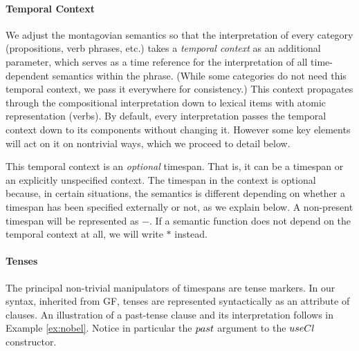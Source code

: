 \documentclass[a4paper,11pt]{article}
\begin{document}
\paragraph{Temporal Context}

We adjust the montagovian semantics so that the interpretation of
every category (propositions, verb phrases, etc.) takes a
\emph{temporal context} as an additional parameter, which serves as a time
reference for the interpretation of all time-dependent semantics
within the phrase. (While some categories do not need this temporal context, we pass it everywhere for consistency.)  This context propagates through the compositional
interpretation down to lexical items with atomic representation
(verbs). By default, every interpretation passes the temporal context
down to its components without changing it. However some key elements
will act on it on nontrivial ways, which we proceed to detail below.

This temporal context is an \emph{optional} timespan. That is, it can
be a timespan or an explicitly unspecified context.
\newcommand\nospan{\ensuremath{-}}
\newcommand\anyspan{\ensuremath{\mathbf{*}}} The timespan in the context is
optional because, in certain situations, the semantics is different
depending on whether a timespan has been specified externally or not,
as we explain below. A non-present timespan will be represented as
\nospan{}. If a semantic function does not depend on the temporal
context at all, we will write \anyspan{} instead.

\paragraph{Tenses}

\newcommand\varid[1]{\mathnormal{#1}}
%
The principal non-trivial manipulators of timespans are tense
markers. In our syntax, inherited from GF, tenses are represented
syntactically as an attribute of clauses. An illustration of a
past-tense clause and its interpretation follows in
Example \ref{ex:nobel}. Notice in particular the $\varid{past}$ argument to
the $\varid{useCl}$ constructor.
\end{document}
